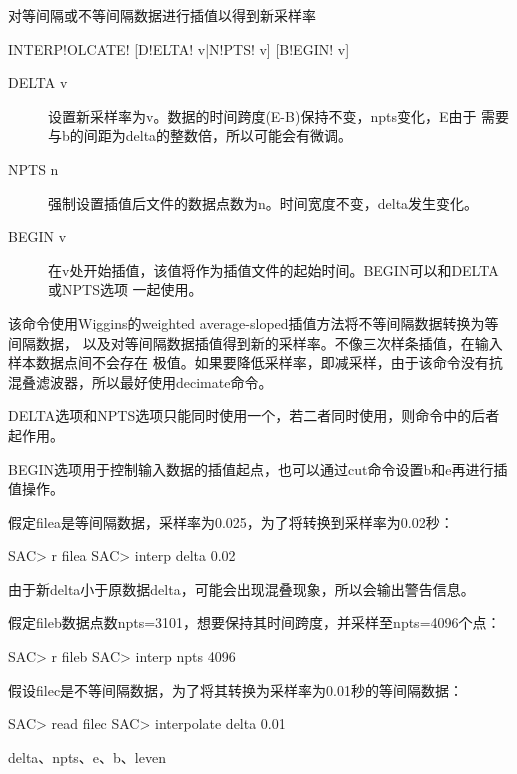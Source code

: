 \label{cmd:interpolate}

对等间隔或不等间隔数据进行插值以得到新采样率

\begin{SACSTX}
INTERP!OLCATE! [D!ELTA! v|N!PTS! v] [B!EGIN! v]
\end{SACSTX}

\begin{description}
\item [DELTA v] 设置新采样率为v。数据的时间跨度(E-B)保持不变，npts变化，E由于
    需要与b的间距为delta的整数倍，所以可能会有微调。
\item [NPTS n] 强制设置插值后文件的数据点数为n。时间宽度不变，delta发生变化。
\item [BEGIN v] 在v处开始插值，该值将作为插值文件的起始时间。BEGIN可以和DELTA或NPTS选项
    一起使用。
\end{description}

该命令使用Wiggins的weighted average-sloped插值方法将不等间隔数据转换为等间隔数据，
以及对等间隔数据插值得到新的采样率。不像三次样条插值，在输入样本数据点间不会存在
极值。如果要降低采样率，即减采样，由于该命令没有抗混叠滤波器，所以最好使用decimate命令。

DELTA选项和NPTS选项只能同时使用一个，若二者同时使用，则命令中的后者起作用。

BEGIN选项用于控制输入数据的插值起点，也可以通过cut命令设置b和e再进行插值操作。

假定filea是等间隔数据，采样率为0.025，为了将转换到采样率为0.02秒：
\begin{SACCode}
SAC> r filea
SAC> interp delta 0.02
\end{SACCode}
由于新delta小于原数据delta，可能会出现混叠现象，所以会输出警告信息。

假定fileb数据点数npts=3101，想要保持其时间跨度，并采样至npts=4096个点：
\begin{SACCode}
SAC> r fileb
SAC> interp npts 4096
\end{SACCode}

假设filec是不等间隔数据，为了将其转换为采样率为0.01秒的等间隔数据：
\begin{SACCode}
SAC> read filec
SAC> interpolate delta 0.01
\end{SACCode}

delta、npts、e、b、leven
